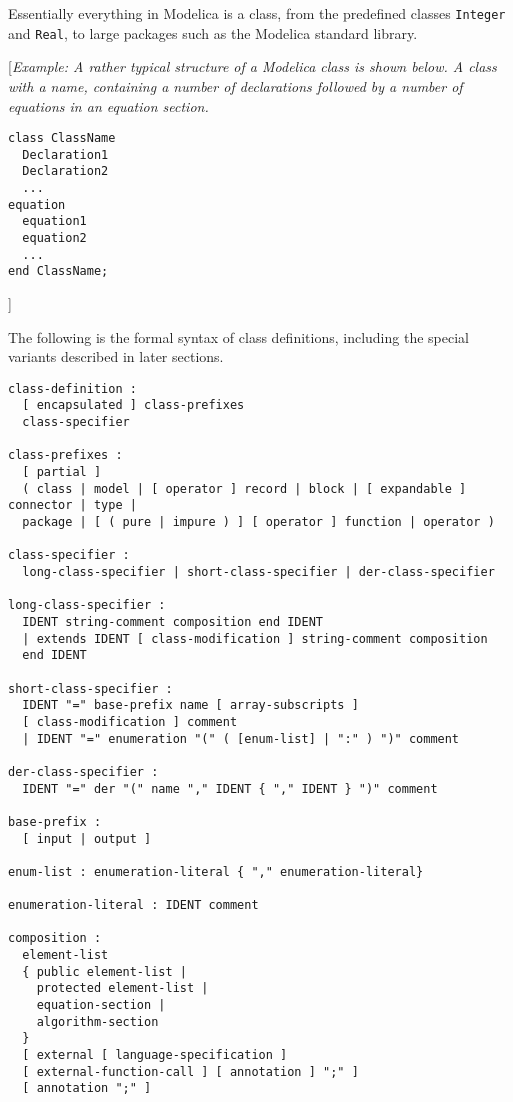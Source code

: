 Essentially everything in Modelica is a class, from the predefined
classes \lstinline!Integer! and \lstinline!Real!, to large packages such as the Modelica
standard library.

{[}\emph{Example: A rather typical structure of a Modelica class is
shown below. A class with a name, containing a number of declarations
followed by a number of equations in an equation section.}

\begin{lstlisting}[language=modelica]
class ClassName
  Declaration1
  Declaration2
  ...
equation
  equation1
  equation2
  ...
end ClassName;
\end{lstlisting}

{]}

The following is the formal syntax of class definitions, including the
special variants described in later sections.

\begin{lstlisting}[language=grammar]
class-definition :
  [ encapsulated ] class-prefixes
  class-specifier

class-prefixes :
  [ partial ]
  ( class | model | [ operator ] record | block | [ expandable ] connector | type |
  package | [ ( pure | impure ) ] [ operator ] function | operator )

class-specifier :
  long-class-specifier | short-class-specifier | der-class-specifier

long-class-specifier :
  IDENT string-comment composition end IDENT
  | extends IDENT [ class-modification ] string-comment composition
  end IDENT

short-class-specifier :
  IDENT "=" base-prefix name [ array-subscripts ]
  [ class-modification ] comment
  | IDENT "=" enumeration "(" ( [enum-list] | ":" ) ")" comment

der-class-specifier :
  IDENT "=" der "(" name "," IDENT { "," IDENT } ")" comment

base-prefix :
  [ input | output ]

enum-list : enumeration-literal { "," enumeration-literal}

enumeration-literal : IDENT comment

composition :
  element-list
  { public element-list |
    protected element-list |
    equation-section |
    algorithm-section
  }
  [ external [ language-specification ]
  [ external-function-call ] [ annotation ] ";" ]
  [ annotation ";" ]
\end{lstlisting}

